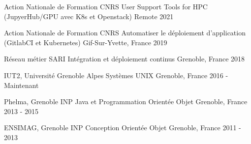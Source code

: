 

\begin{cventries}

  \cventrynodescr
    {Action Nationale de Formation CNRS} %
    {User Support Tools for HPC (JupyerHub/GPU avec K8s et Openstack)} %
    {Remote} %
    {2021} %

  \cventrynodescr
    {Action Nationale de Formation CNRS} %
    {Automatiser le déploiement d'application (GitlabCI et Kubernetes)} %
    {Gif-Sur-Yvette, France} %
    {2019} %

  \cventrynodescr
    {Réseau métier SARI} %
    {Intégration et déploiement continus} %
    {Grenoble, France} %
    {2018} %

  \cventrynodescr
    {IUT2, Université Grenoble Alpes} %
    {Systèmes UNIX} %
    {Grenoble, France} %
    {2016 - Maintenant} %

  \cventrynodescr
    {Phelma, Grenoble INP} %
    {Java et Programmation Orientée Objet} %
    {Grenoble, France} %
    {2013 - 2015} %

  \cventrynodescr
    {ENSIMAG, Grenoble INP} %
    {Conception Orientée Objet} %
    {Grenoble, France} %
    {2011 - 2013} %
    
\end{cventries}
